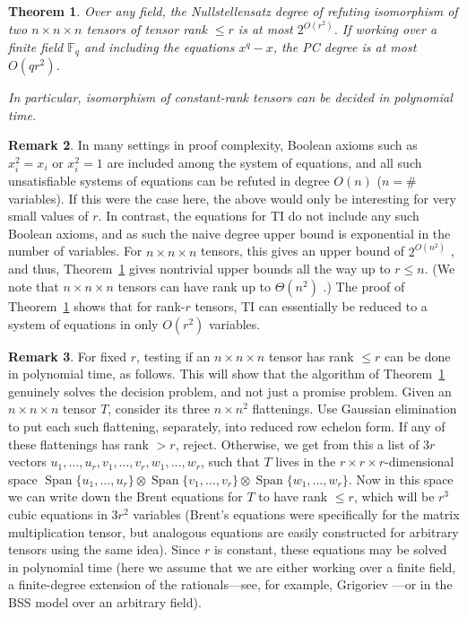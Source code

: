 \documentclass[10pt,a4paper]{article}
\newtheorem{theorem}{Theorem}[section]
\theoremstyle{definition}
\newtheorem{remark}[theorem]{Remark}
\DeclareMathOperator{\Span}{Span}
\newcommand{\F}{\mathbb{F}}
\begin{document}
\begin{theorem} \label{thm:upper}
Over any field, the Nullstellensatz degree of refuting isomorphism of two $n \times n \times n$ tensors of tensor rank $\leq r$ is at most $2^{O(r^2)}$. If working over a finite field $\F_q$ and including the equations $x^q - x$, the PC degree is at most $O(qr^2)$. 

In particular, isomorphism of constant-rank tensors can be decided in polynomial time.
\end{theorem}

\begin{remark} \label{rmk:boolean}
In many settings in proof complexity, Boolean axioms such as $x_i^2 = x_i$ or $x_i^2 = 1$ are included among the system of equations, and all such unsatisfiable systems of equations can be refuted in degree $O(n)$ ($n=$\# variables). If this were the case here, the above would only be interesting for very small values of $r$. In contrast, the equations for \textsc{TI} do not include any such Boolean axioms, and as such the naive degree upper bound is exponential in the number of variables. For $n \times n \times n$ tensors, this gives an upper bound of $2^{O(n^2)}$ \cite{sombra}, and thus, Theorem~\ref{thm:upper} gives nontrivial upper bounds all the way up to $r \leq n$. (We note that $n \times n \times n$ tensors can have rank up to $\Theta(n^2)$ \cite{lickteigTypical}.) The proof of Theorem~\ref{thm:upper} shows that for rank-$r$ tensors, \textsc{TI} can essentially be reduced to a system of equations in only $O(r^2)$ variables.
\end{remark}

\begin{remark} \label{rmk:rank}
For fixed $r$, testing if an $n \times n \times n$ tensor has rank $\leq r$ can be done in polynomial time, as follows. This will show that the algorithm of Theorem~\ref{thm:upper} genuinely solves the decision problem, and not just a promise problem. Given an $n \times n \times n$ tensor $T$, consider its three $n \times n^2$ flattenings. Use Gaussian elimination to put each such flattening, separately, into reduced row echelon form. If any of these flattenings has rank $> r$, reject. Otherwise, we get from this a list of $3r$ vectors $u_1, \dotsc, u_r, v_1, \dotsc, v_r, w_1, \dotsc, w_r$, such that $T$ lives in the $r \times r \times r$-dimensional space $\Span\{u_1, \dotsc, u_r\} \otimes \Span\{v_1, \dotsc, v_r\} \otimes \Span\{w_1, \dotsc, w_r\}$. Now in this space we can write down the Brent equations \cite{brent} for $T$ to have rank $\leq r$, which will be $r^3$ cubic equations in $3r^2$ variables (Brent's equations \cite[(5.06)]{brent} were specifically for the matrix multiplication tensor, but analogous equations are easily constructed for arbitrary tensors using the same idea). Since $r$ is constant, these equations may be solved in polynomial time (here we assume that we are either working over a finite field, a finite-degree extension of the rationals---see, for example, Grigoriev \cite{grigoriev}---or in the BSS model over an arbitrary field).
\end{remark}
\end{document}
